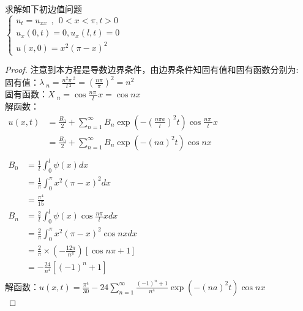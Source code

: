 \begin{example} %
	求解如下初边值问题\\
	$\displaystyle  \begin{cases}
		u_{t} =u_{xx} ~~,~~ 0<x<\pi, t>0\\
		u_x (0,t) =0, u_x (l,t)=0 \\
		u(x,0) =x^2 (\pi-x)^2
	\end{cases}$ \\	
	\begin{proof} 
		注意到本方程是导数边界条件，由边界条件知固有值和固有函数分别为:\\
	固有值：$\displaystyle  \lambda~_n=\frac{n^2\pi~^2}{l~^2 }= (\frac{n\pi }{\pi}) ^2 = n^2$ \\ 
	固有函数：$\displaystyle  X~_n=\cos \frac{n\pi~}{l} x=\cos nx $\\

	解函数：\\ 
$\displaystyle \begin{array}{llll}
	u(x,t)&= \frac{B_0}{2} + \sum_{n=1}^{\infty } B_n  \exp(-(\frac{n\pi a}{l})^2 t) \cos \frac{n\pi~}{l} x\\
	        &= \frac{B_0}{2} + \sum_{n=1}^{\infty } B_n  \exp(-(na)^2 t) \cos n x \\
	\end{array}$ \\ 
	
	$\displaystyle \begin{array}{lllllllll}
	B_0&=\frac{1}{l} \int_{0}^{l} \psi(x) dx   \\
	&= \frac{1}{\pi} \int_{0}^{\pi}  x^2 (\pi-x)^2 dx  \\
	&=\frac{\pi ^4}{15}\\
	B_n&=\frac{2}{l} \int_{0}^{l} \psi(x) \cos \frac{n\pi}{l} xdx \\
	&= \frac{2}{\pi} \int_{0}^{\pi}   x^2 (\pi-x)^2   \cos nx dx \\
	&= \frac{2}{\pi} \times (-\frac{12 \pi}{n^4})  [\cos n\pi +1 ] \\
	&= -\frac{24}{n^4} [ (-1)^n +1 ] \\
\end{array}$ \\ 
解函数：$\displaystyle  u(x,t) =  \frac{\pi ^4}{30} -24 \sum_{n=1}^{\infty } \frac{(-1)^n +1 }{n^4}  \exp(-(na)^2 t) \cos n x$\\
	\end{proof}
\end{example}


